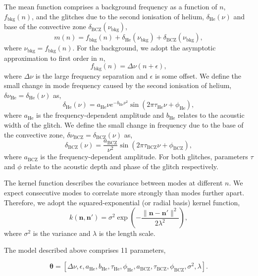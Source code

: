\documentclass[linenumbers,modern]{aastex631dm}
\newcommand{\helium}{\mathrm{He}}
\newcommand{\bcz}{\mathrm{BCZ}}
\newcommand{\bkg}{\mathrm{bkg}}
\begin{document}
The mean function comprises a background frequency as a function of \(n\),
\(f_\bkg(n)\), and the glitches due to the second ionisation of helium,
\(\delta_\helium(\nu)\) and base of the convective zone
\(\delta_\bcz(\nu_\bkg)\),
%
\begin{equation}
    m(n) = f_\bkg(n) + \delta_\helium(\nu_\bkg) +
    \delta_\bcz(\nu_\bkg),
\end{equation}
%
where \(\nu_\bkg = f_\bkg(n)\). For the background, we adopt the
asymptotic approximation to first order in \(n\),
%
\begin{equation}
    f_\bkg(n) = \Delta\nu (n + \epsilon),
\end{equation}
%
where \(\Delta\nu\) is the large frequency separation and \(\epsilon\) is some
offset. We define the small change in mode frequency caused by the second
ionisation of helium, \(\delta\nu_\helium = \delta_\helium(\nu)\) as,
%
\begin{equation}
    \delta_\helium(\nu) = a_\helium \nu e^{- b_\helium \nu^2}
    \sin\left( 2 \pi \tau_\helium \nu + \phi_\helium \right),
\end{equation}
%
where \(a_\helium\) is the frequency-dependent amplitude and \(b_\helium\)
relates to the acoustic width of the glitch. We define the small change in
frequency due to the base of the convective zone,
\(\delta\nu_\bcz = \delta_\bcz(\nu)\) as,
%
\begin{equation}
    \delta_\bcz(\nu) = \frac{a_\bcz}{\nu^2}
    \sin\left( 2 \pi \tau_\bcz \nu + \phi_\bcz \right),
\end{equation}
%
where \(a_\bcz\) is the frequency-dependent amplitude. For both glitches,
parameters \(\tau\) and \(\phi\) relate to the acoustic depth and phase of
the glitch respectively.

The kernel function describes the covariance between modes at different \(n\).
We expect consecutive modes to correlate more strongly than modes further
apart. Therefore, we adopt the squared-exponential (or radial basis) kernel
function,
%
\begin{equation}
    k(\bm n, \bm n') = \sigma^2 
    \exp\left(- \frac{\| \bm n - \bm n' \|^2}{2\lambda^2}\right),
\end{equation}
%
where \(\sigma^2\) is the variance and \(\lambda\) is the length scale.

The model described above comprises 11 parameters,

\begin{equation}
    \bm\theta = [\Delta\nu, \epsilon, a_\helium, b_\helium, \tau_\helium,
    \phi_\helium, a_\bcz, \tau_\bcz, \phi_\bcz, \sigma^2, \lambda].
\end{equation}
\end{document}
